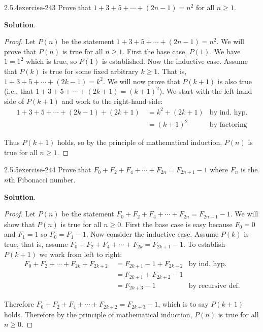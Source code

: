 \documentclass[twoside,11pt,]{book}
\numberwithin{equation}{chapter}
\newcommand{\amp}{&}
\begin{document}
\begin{divisionsolution}{2.5.4}{}{exercise-243}%
\hypertarget{p-3592}{}%
Prove that \(1 + 3 + 5 + \cdots + (2n-1) = n^2\) for all \(n \ge 1\).%
\par\smallskip%
\noindent\textbf{Solution}.\quad%
\begin{proof}{}
\hypertarget{p-3593}{}%
Let \(P(n)\) be the statement \(1+3 +5 + \cdots + (2n-1) = n^2\). We will prove that \(P(n)\) is true for all \(n \ge 1\). First the base case, \(P(1)\). We have \(1 = 1^2\) which is true, so \(P(1)\) is established. Now the inductive case. Assume that \(P(k)\) is true for some fixed arbitrary \(k \ge 1\). That is, \(1 + 3 + 5 + \cdots + (2k-1) = k^2\). We will now prove that \(P(k+1)\) is also true (i.e., that \(1 + 3 + 5 + \cdots + (2k+1) = (k+1)^2\)). We start with the left-hand side of \(P(k+1)\) and work to the right-hand side:%
\begin{align*}
1 + 3 + 5 + \cdots + (2k-1) + (2k+1) ~ \amp = k^2 + (2k+1) \amp \text{by ind. hyp.}\\
\amp = (k+1)^2 \amp \text{by factoring}
\end{align*}
%
\par
\hypertarget{p-3594}{}%
Thus \(P(k+1)\) holds, so by the principle of mathematical induction, \(P(n)\) is true for all \(n \ge 1\).%
\end{proof}
\end{divisionsolution}%
\begin{divisionsolution}{2.5.5}{}{exercise-244}%
\hypertarget{p-3595}{}%
Prove that \(F_0 + F_2 + F_4 + \cdots + F_{2n} = F_{2n+1} - 1\) where \(F_n\) is the \(n\)th Fibonacci number.%
\par\smallskip%
\noindent\textbf{Solution}.\quad%
\begin{proof}{}
\hypertarget{p-3596}{}%
Let \(P(n)\) be the statement \(F_0 + F_2 + F_4 + \cdots + F_{2n} = F_{2n+1} - 1\). We will show that \(P(n)\) is true for all \(n \ge 0\). First the base case is easy because \(F_0 = 0\) and \(F_1 = 1\) so \(F_0 = F_1 - 1\). Now consider the inductive case. Assume \(P(k)\) is true, that is, assume \(F_0 + F_2 + F_4 + \cdots + F_{2k} = F_{2k+1} - 1\). To establish \(P(k+1)\) we work from left to right:%
\begin{align*}
F_0 + F_2 + \cdots + F_{2k} + F_{2k+2} ~ \amp = F_{2k+1} - 1 + F_{2k+2} \amp \text{by ind. hyp.}\\
\amp = F_{2k+1} + F_{2k+2} - 1 \amp\\
\amp = F_{2k+3} - 1 \amp \text{by recursive def.}
\end{align*}
%
\par
\hypertarget{p-3597}{}%
Therefore \(F_0 + F_2 + F_4 + \cdots + F_{2k+2} = F_{2k+3} - 1\), which is to say \(P(k+1)\) holds. Therefore by the principle of mathematical induction, \(P(n)\) is true for all \(n \ge 0\).%
\end{proof}
\end{divisionsolution}%
\end{document}
